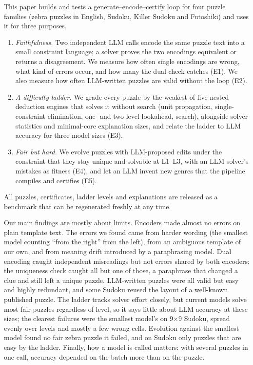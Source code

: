 This paper builds and tests a generate--encode--certify loop for four puzzle families (zebra puzzles in English, Sudoku, Killer Sudoku and Futoshiki) and uses it for three purposes.
\begin{enumerate}[leftmargin=1.4em,itemsep=1pt,topsep=2pt]
\item \emph{Faithfulness.} Two independent LLM calls encode the same puzzle text into a small constraint language; a solver proves the two encodings equivalent or returns a disagreement. We measure how often single encodings are wrong, what kind of errors occur, and how many the dual check catches (E1). We also measure how often LLM-written puzzles are valid without the loop (E2).
\item \emph{A difficulty ladder.} We grade every puzzle by the weakest of five nested deduction engines that solves it without search (unit propagation, single-constraint elimination, one- and two-level lookahead, search), alongside solver statistics and minimal-core explanation sizes, and relate the ladder to LLM accuracy for three model sizes (E3).
\item \emph{Fair but hard.} We evolve puzzles with LLM-proposed edits under the constraint that they stay unique and solvable at L1--L3, with an LLM solver's mistakes as fitness (E4), and let an LLM invent new genres that the pipeline compiles and certifies (E5).
\end{enumerate}
All puzzles, certificates, ladder levels and explanations are released as a benchmark that can be regenerated freshly at any time.

Our main findings are mostly about limits. Encoders made almost no errors on plain template text. The errors we found came from harder wording (the smallest model counting ``from the right'' from the left), from an ambiguous template of our own, and from meaning drift introduced by a paraphrasing model. Dual encoding caught independent misreadings but not errors shared by both encoders; the uniqueness check caught all but one of those, a paraphrase that changed a clue and still left a unique puzzle. LLM-written puzzles were all valid but easy and highly redundant, and some Sudoku reused the layout of a well-known published puzzle. The ladder tracks solver effort closely, but current models solve most fair puzzles regardless of level, so it says little about LLM accuracy at these sizes; the clearest failures were the smallest model's on 9$\times$9 Sudoku, spread evenly over levels and mostly a few wrong cells. Evolution against the smallest model found no fair zebra puzzle it failed, and on Sudoku only puzzles that are easy by the ladder. Finally, how a model is called matters: with several puzzles in one call, accuracy depended on the batch more than on the puzzle.
